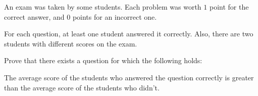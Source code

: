 An exam was taken by some students. Each problem was worth $1$ point for the correct answer, and $0$ points for an incorrect one.

For each question, at least one student answered it correctly. Also, there are two students with different scores on the exam.

Prove that there exists a question for which the following holds:

The average score of the students who answered the question correctly is greater than the average score of the students who didn't.